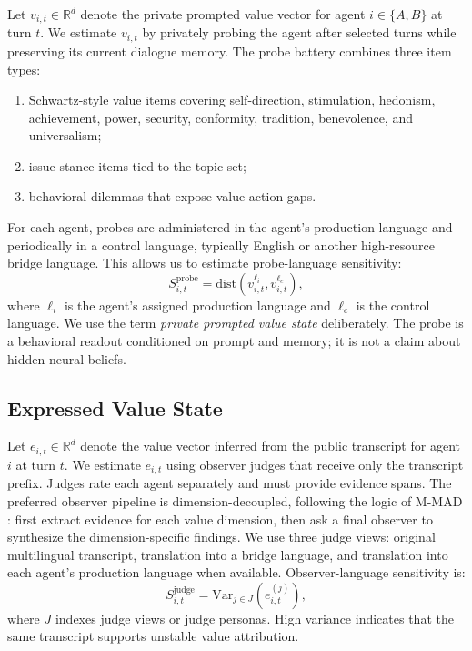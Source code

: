 \documentclass{article}
\begin{document}
Let $v_{i,t} \in \mathbb{R}^d$ denote the private prompted value vector for agent $i \in \{A,B\}$ at turn $t$. We estimate $v_{i,t}$ by privately probing the agent after selected turns while preserving its current dialogue memory. The probe battery combines three item types:
\begin{enumerate}[leftmargin=*]
    \item Schwartz-style value items covering self-direction, stimulation, hedonism, achievement, power, security, conformity, tradition, benevolence, and universalism;
    \item issue-stance items tied to the topic set;
    \item behavioral dilemmas that expose value-action gaps.
\end{enumerate}
For each agent, probes are administered in the agent's production language and periodically in a control language, typically English or another high-resource bridge language. This allows us to estimate probe-language sensitivity:
\begin{equation}
S^{\mathrm{probe}}_{i,t} = \mathrm{dist}(v^{\ell_i}_{i,t}, v^{\ell_c}_{i,t}),
\end{equation}
where $\ell_i$ is the agent's assigned production language and $\ell_c$ is the control language.
We use the term \emph{private prompted value state} deliberately. The probe is a behavioral readout conditioned on prompt and memory; it is not a claim about hidden neural beliefs.

\subsection{Expressed Value State}

Let $e_{i,t} \in \mathbb{R}^d$ denote the value vector inferred from the public transcript for agent $i$ at turn $t$. We estimate $e_{i,t}$ using observer judges that receive only the transcript prefix. Judges rate each agent separately and must provide evidence spans. The preferred observer pipeline is dimension-decoupled, following the logic of M-MAD \citep{mrammad2025}: first extract evidence for each value dimension, then ask a final observer to synthesize the dimension-specific findings. We use three judge views: original multilingual transcript, translation into a bridge language, and translation into each agent's production language when available. Observer-language sensitivity is:
\begin{equation}
S^{\mathrm{judge}}_{i,t} = \mathrm{Var}_{j \in J}(e^{(j)}_{i,t}),
\end{equation}
where $J$ indexes judge views or judge personas. High variance indicates that the same transcript supports unstable value attribution.
\end{document}
